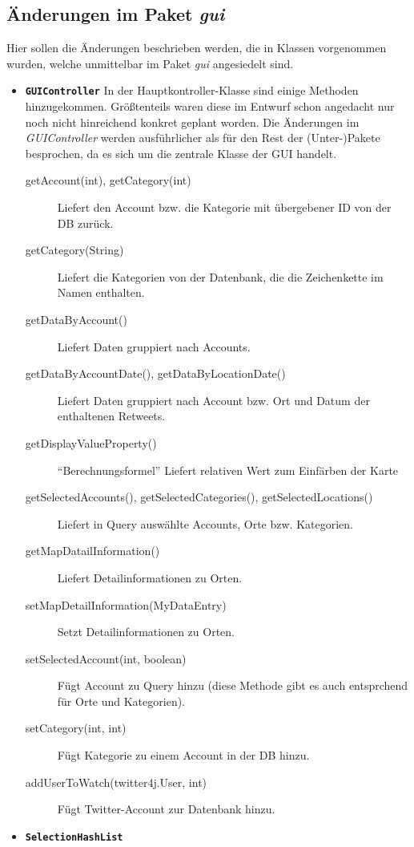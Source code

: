 \subsection{Änderungen im Paket \emph{gui}}
Hier sollen die Änderungen beschrieben werden, die in Klassen vorgenommen wurden, welche unmittelbar im Paket \emph{gui} angesiedelt sind.
\begin{itemize}
	\item \textbf{\lstinline{GUIController}}
	\quad 
	In der Hauptkontroller-Klasse sind einige Methoden hinzugekommen. Größtenteils waren diese im Entwurf schon angedacht nur noch nicht hinreichend konkret geplant worden. Die Änderungen im \emph{GUIController} werden ausführlicher als für den Rest der (Unter-)Pakete besprochen, da es sich um die zentrale Klasse der GUI handelt.
	\begin{description}
		\item[getAccount(int), getCategory(int)] Liefert den Account bzw. die Kategorie mit übergebener ID von der DB zurück.
		\item[getCategory(String)] Liefert die Kategorien von der Datenbank, die die Zeichenkette im Namen enthalten.
		\item[getDataByAccount()] Liefert Daten gruppiert nach Accounts.
		\item[getDataByAccountDate(), getDataByLocationDate()] Liefert Daten gruppiert nach Account bzw. Ort und Datum der enthaltenen Retweets.
		\item[getDisplayValueProperty()] "`Berechnungsformel"' Liefert relativen Wert zum Einfärben der Karte
		\item[getSelectedAccounts(), getSelectedCategories(), getSelectedLocations()] Liefert in Query auswählte Accounts, Orte bzw. Kategorien.
		\item[getMapDatailInformation()] Liefert Detailinformationen zu Orten.
		\item[setMapDetailInformation(MyDataEntry)] Setzt Detailinformationen zu Orten.
		\item[setSelectedAccount(int, boolean)] Fügt Account zu Query hinzu (diese Methode gibt es auch entsprchend für Orte und Kategorien).
		\item[setCategory(int, int)] Fügt Kategorie zu einem Account in der DB hinzu.
		\item[addUserToWatch(twitter4j.User, int)] Fügt Twitter-Account zur Datenbank hinzu.
	\end{description}
	\item \textbf{\lstinline{SelectionHashList}}\quad

\end{itemize}
